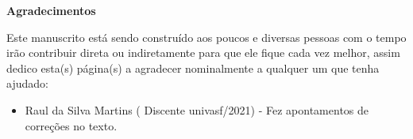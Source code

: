 \begingroup
\thispagestyle{empty}
\begin{center}
	{\normalfont\fontsize{20}{20}\sffamily\selectfont \textbf{Agradecimentos}}\par
\end{center}

\vspace{1cm}

Este manuscrito está sendo construído aos poucos e diversas pessoas com o tempo irão contribuir direta ou indiretamente para que ele fique cada vez melhor, assim dedico esta(s) página(s) a agradecer nominalmente a qualquer um que tenha ajudado:

\begin{itemize}
	\item {\color{red}Raul da Silva Martins} ({\color{blue} Discente univasf/2021}) - Fez apontamentos de correções no texto.
\end{itemize}

\endgroup